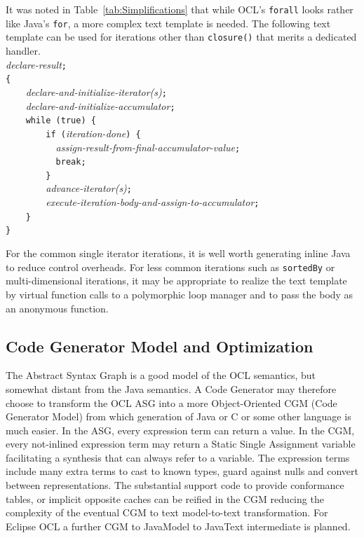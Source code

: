 \documentclass[sigconf]{acmart}
\begin{document}
It was noted in Table~\ref{tab:Simplifications} that while OCL's \verb|forall| looks rather like Java's \verb|for|, a more complex text template is needed. The following text template can be used for iterations other than \verb|closure()| that merits a dedicated handler. 
\\
\verb||\textit{declare-result}\verb|;|\\
\verb|{|\\
\verb|    |\textit{declare-and-initialize-iterator(s)}\verb|;|\\
\verb|    |\textit{declare-and-initialize-accumulator}\verb|;|\\
\verb|    while (true) {|\\
\verb|        if (|\textit{iteration-done}\verb|) {|\\
\verb|        	|\textit{assign-result-from-final-accumulator-value}\verb|;|\\
\verb|        	break;|\\
\verb|        }|\\
\verb|        |\textit{advance-iterator(s)}\verb|;|\\
\verb|        |\textit{execute-iteration-body-and-assign-to-accumulator}\verb|;|\\
\verb|    }|\\
\verb|}|

For the common single iterator iterations, it is well worth generating inline Java to reduce control overheads. For less common iterations such as \verb|sortedBy| or multi-dimensional iterations, it may be appropriate to realize the text template by virtual function calls to a polymorphic loop manager and to pass the body as an anonymous function.

\subsection{Code Generator Model and Optimization}

The Abstract Syntax Graph is a good model of the OCL semantics, but somewhat distant from the Java semantics. A Code Generator may therefore choose to transform the OCL ASG into a more Object-Oriented CGM (Code Generator Model) from which generation of Java or C or some other language is much easier. In the ASG, every expression term can return a value. In the CGM, every not-inlined expression term may return a Static Single Assignment variable facilitating a synthesis that can always refer to a variable. The expression terms include many extra terms to cast to known types, guard against nulls and convert between representations. The substantial support code to provide conformance tables, or implicit opposite caches can be reified in the CGM reducing the complexity of the eventual CGM to text model-to-text transformation. For Eclipse OCL a further CGM to JavaModel to JavaText intermediate is planned. 
\end{document}
